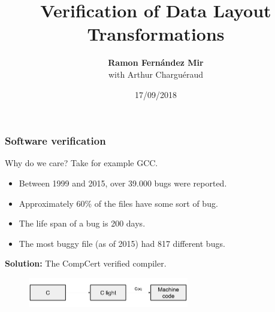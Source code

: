 \def\macrosUseBeamer{}



\usepackage{fancyvrb}
\usepackage{graphicx}
\usepackage{multicol}

\newcommand\tab{$\hphantom{--}$}





\title{Verification of Data Layout Transformations}
\author[Ramon Fern\'{a}ndez Mir]{{\bf Ramon Fern\'{a}ndez Mir}\\ \vspace{1em} with Arthur Charguéraud }
\date{17/09/2018}

\frame{\titlepage}





\begin{frame}[fragile]
\frametitle{Software verification}

Why do we care? Take for example GCC.
\begin{itemize}
	\item Between 1999 and 2015, over 39.000 bugs were reported.
	\item Approximately 60\% of the files have some sort of bug.
	\item The life span of a bug is 200 days.
	\item The most buggy file (as of 2015) had 817 different bugs. 
\end{itemize}

\bigskip \pause

\textbf{Solution:} The CompCert verified compiler.
\begin{figure}[H]
\centering
\includegraphics[width=7cm]{images/compcert}
\end{figure}

\end{frame}


